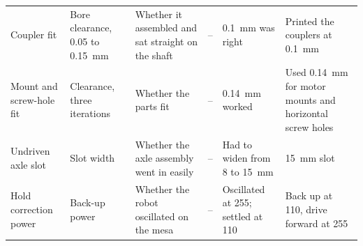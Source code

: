 \begin{table}[htbp]
{\begin{tabularx}{\textwidth}{@{}>{\raggedright\arraybackslash}p{} L L L L L@{}}
    Coupler fit & Bore clearance, 0.05 to \qty{0.15}{mm} & Whether it assembled and sat straight on the shaft & -- & \qty{0.1}{mm} was right & Printed the couplers at \qty{0.1}{mm} \\
    Mount and screw-hole fit & Clearance, three iterations & Whether the parts fit & -- & \qty{0.14}{mm} worked & Used \qty{0.14}{mm} for motor mounts and horizontal screw holes \\
    Undriven axle slot & Slot width & Whether the axle assembly went in easily & -- & Had to widen from 8 to \qty{15}{mm} & \qty{15}{mm} slot \\
    Hold correction power & Back-up power & Whether the robot oscillated on the mesa & -- & Oscillated at 255; settled at 110 & Back up at 110, drive forward at 255 \\
    \bottomrule
  \end{tabularx}
  }
\end{table}
